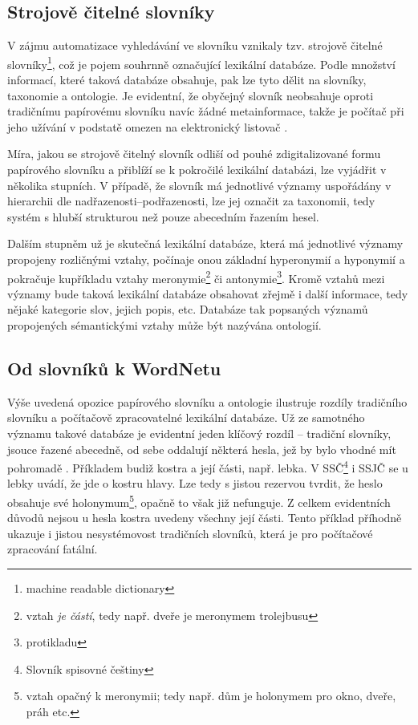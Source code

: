 \documentclass[a4paper, 11pt, oneside]{book}
\newcommand{\td}[2][]{
	{\todo[size=\footnotesize]{#2}}
}
\newcommand\ex{\textsf}
\begin{document}
			\subsection{Strojově čitelné slovníky}

				V zájmu automatizace vyhledávání ve slovníku vznikaly tzv. strojově čitelné slovníky\footnote{machine readable dictionary}, což je pojem souhrnně označující lexikální databáze. Podle množství informací, které taková databáze obsahuje, pak lze tyto dělit na slovníky, taxonomie a ontologie. Je evidentní, že obyčejný slovník neobsahuje oproti tradičnímu papírovému slovníku navíc žádné metainformace, takže je počítač při jeho užívání v podstatě omezen na elektronický listovač \parencite{miller1990introduction}. 

				Míra, jakou se strojově čitelný slovník odliší od pouhé zdigitalizované formu papírového slovníku a přiblíží se k pokročilé lexikální databázi, lze vyjádřit v několika stupních. V případě, že slovník má jednotlivé významy\td{nejakej link, kde budou významy/senses vysvetleny} uspořádány v hierarchii dle nadřazenosti--podřazenosti, lze jej označit za taxonomii, tedy systém s hlubší strukturou než pouze abecedním řazením hesel. 

				Dalším stupněm už je skutečná lexikální databáze, která má jednotlivé významy propojeny rozličnými vztahy, počínaje onou základní hyperonymií a hyponymií a pokračuje kupříkladu vztahy meronymie\footnote{vztah \textit{je částí}, tedy např. \ex{dveře} je meronymem \ex{trolejbusu}} či antonymie\footnote{protikladu}. Kromě vztahů mezi významy bude taková lexikální databáze obsahovat zřejmě i další informace, tedy nějaké kategorie slov, jejich popis, etc. Databáze tak popsaných významů propojených sémantickými vztahy může být nazývána ontologií.\parencite{garshoi2004metadata}

			\subsection{Od slovníků k WordNetu}

				Výše uvedená opozice papírového slovníku a ontologie ilustruje rozdíly tradičního slovníku a počítačově zpracovatelné lexikální databáze. Už ze samotného významu takové databáze je evidentní jeden klíčový rozdíl -- tradiční slovníky, jsouce řazené abecedně, od sebe oddalují některá hesla, jež by bylo vhodné mít pohromadě \parencite{pala2013vceska}. Příkladem budiž \ex{kostra} a její části, např. \ex{lebka}. V SSČ\footnote{Slovník spisovné češtiny} i SSJČ se u \ex{lebky} uvádí, že jde o \ex{kostru hlavy}. Lze tedy s jistou rezervou tvrdit, že heslo obsahuje své holonymum\footnote{vztah opačný k meronymii; tedy např. \ex{dům} je holonymem pro \ex{okno}, \ex{dveře}, \ex{práh} etc.}, opačně to však již nefunguje. Z celkem evidentních důvodů nejsou u hesla \ex{kostra} uvedeny všechny její části. Tento příklad příhodně ukazuje i jistou nesystémovost tradičních slovníků, která je pro počítačové zpracování fatální. %
\end{document}
